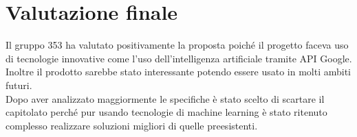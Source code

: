\documentclass[StudioDiFattibilità.tex]{subfiles}
\begin{document}
\section{Valutazione finale}
Il gruppo 353 ha valutato positivamente la proposta poiché il progetto faceva uso di tecnologie innovative come l'uso dell'intelligenza artificiale tramite API Google.
Inoltre il prodotto sarebbe stato interessante potendo essere usato in molti ambiti futuri.\\
Dopo aver analizzato maggiormente le specifiche è stato scelto di scartare il capitolato perché pur usando tecnologie di machine learning  è stato ritenuto complesso realizzare soluzioni migliori di quelle preesistenti.
\end{document}
